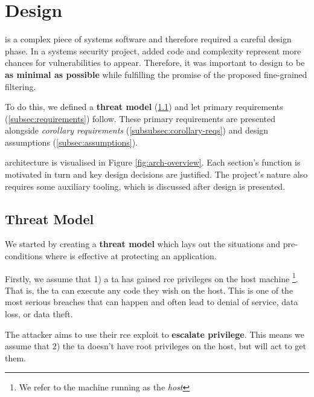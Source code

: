 \section{Design} \label{sec:design}

%
        

\af is a complex piece of systems software and therefore required a
careful design phase. In a systems security project, added code and complexity
represent more chances for vulnerabilities to appear. Therefore, it was
important to design \af to be \textbf{as minimal as possible} while fulfilling
the promise of the proposed fine-grained filtering.

To do this, we defined a \textbf{threat model} (\ref{subsec:threat-model}) and
let primary requirements (\ref{subsec:requirements}) follow. These primary
requirements are presented alongside \textit{corollary requirements}
(\ref{subsubsec:corollary-reqs}) and design assumptions
(\ref{subsec:assumptions}).

\afg architecture is visualised in Figure \ref{fig:arch-overview}. Each
section's function is motivated in turn and key design decisions are justified.
The project's nature also requires some auxiliary tooling, which is discussed
after \afg design is presented.

\subsection{Threat Model}\label{subsec:threat-model}


We started by creating a \textbf{threat model} which lays out the situations and
pre-conditions where \af is effective at protecting an application.

Firstly, we assume that 1) a \ac{ta} has gained \ac{rce} privileges on the host
machine \footnote{We refer to the machine running \af as the \textit{host
}}. That is, the \ac{ta} can execute any code they wish on the host. This is one of the most serious breaches that can happen and often
lead to denial of service, data loss, or data theft.%

The attacker aims to use their \ac{rce} exploit to \textbf{escalate privilege}. This
means we assume that 2) the \ac{ta} doesn't have root privileges on the host,
but will act to get them.


